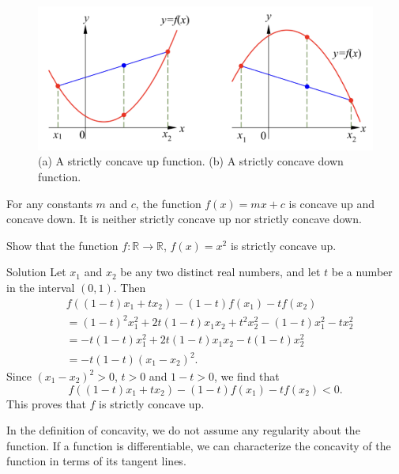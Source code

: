 \begin{example}{}
\begin{figure}[ht]
\centering
\includegraphics[scale=0.2]{Picture35.png}
\caption{(a) A strictly concave up function. (b)  A strictly concave down function.\fa}\label{figure35}
\end{figure}


\begin{example}{}
For any constants $m$ and $c$, the function $f(x)=mx+c$ is concave up and concave down. It is neither strictly concave up nor strictly concave down.
\end{example}

\begin{example}
{}
Show that the function $f:\mathbb{R}\to\mathbb{R}$, $f(x)=x^2$ is strictly concave up.
\end{example}
\begin{solution}{Solution}
Let $x_1$ and $x_2$ be any two distinct real numbers, and let $t$ be a number in the interval $(0,1)$. Then
\begin{align*}
&f((1-t)x_1+tx_2)-(1-t)f(x_1)-tf(x_2)\\&=(1-t)^2x_1^2+2t(1-t)x_1x_2+t^2x_2^2-(1-t)x_1^2-tx_2^2\\
&=-t(1-t)x_1^2+2t(1-t)x_1x_2-t(1-t)x_2^2\\
&=-t(1-t)(x_1-x_2)^2.
\end{align*}
Since   $(x_1-x_2)^2>0$, $t>0$ and $1-t>0$, we find that
\[f((1-t)x_1+tx_2)-(1-t)f(x_1)-tf(x_2)<0.\]
This proves that $f$ is strictly concave up.
\end{solution}



In the definition of concavity, we do not assume any regularity about the function. If a function is differentiable, we can characterize the concavity of the function in terms of its tangent lines.


\end{example}

